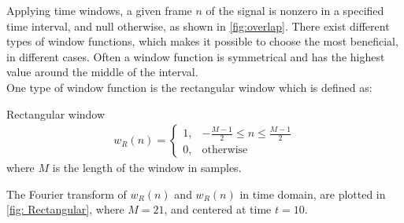 Applying time windows, a given frame $n$ of the signal is nonzero in a specified time interval, and null otherwise, as shown in \autoref{fig:overlap}. There exist different types of window functions, which makes it possible to choose the most beneficial, in different cases. Often a window function is symmetrical and has the highest value around the middle of the interval. \\
One type of window function is the rectangular window which is defined as:
\begin{definition}{Rectangular window}
\begin{align*}
    w_R(n)=
    \begin{cases}
    1, & -\frac{M-1}{2}\leq n \leq \frac{M-1}{2} \\
    0, & \text{otherwise}
    \end{cases}
\end{align*}
where $M$ is the length of the window in samples.
\end{definition}
The Fourier transform of $w_R(n)$ and $w_R(n)$ in time domain, are plotted in \autoref{fig: Rectangular}, where $M=21$, and centered at time $t=10$. 
